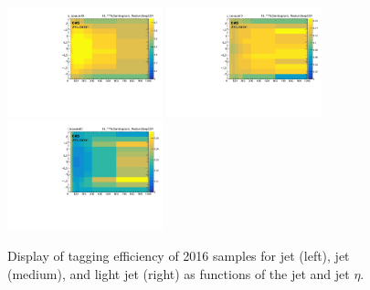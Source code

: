 \begin{figure}\centering
    \includegraphics[width=0.4\textwidth]{figure/BtagEffPlot_16_TTToSemiLeptonic_eff2D_b_MediumDeepCSV.pdf}
    \includegraphics[width=0.4\textwidth]{figure/BtagEffPlot_16_TTToSemiLeptonic_eff2D_c_MediumDeepCSV.pdf}
    \includegraphics[width=0.4\textwidth]{figure/BtagEffPlot_16_TTToSemiLeptonic_eff2D_l_MediumDeepCSV.pdf}
    \caption[Display of \PQb tagging efficiency of 2016 \ttbar samples.]
    {
        Display of \PQb tagging efficiency of 2016 \ttbar samples for \PQb jet (left), \PQc jet (medium), and light jet (right) as functions of the jet \PT and jet $\eta$.
    }
    \label{fig:reco_beff16}
\end{figure}
